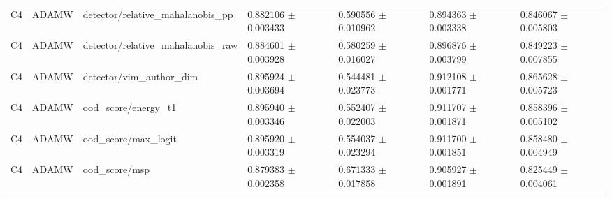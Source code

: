 \begin{longtable}{lllllll}
C4 & ADAMW & detector/relative\_mahalanobis\_pp & 0.882106 $\pm$ 0.003433 & 0.590556 $\pm$ 0.010962 & 0.894363 $\pm$ 0.003338 & 0.846067 $\pm$ 0.005803 \\
C4 & ADAMW & detector/relative\_mahalanobis\_raw & 0.884601 $\pm$ 0.003928 & 0.580259 $\pm$ 0.016027 & 0.896876 $\pm$ 0.003799 & 0.849223 $\pm$ 0.007855 \\
C4 & ADAMW & detector/vim\_author\_dim & 0.895924 $\pm$ 0.003694 & 0.544481 $\pm$ 0.023773 & 0.912108 $\pm$ 0.001771 & 0.865628 $\pm$ 0.005723 \\
C4 & ADAMW & ood\_score/energy\_t1 & 0.895940 $\pm$ 0.003346 & 0.552407 $\pm$ 0.022003 & 0.911707 $\pm$ 0.001871 & 0.858396 $\pm$ 0.005102 \\
C4 & ADAMW & ood\_score/max\_logit & 0.895920 $\pm$ 0.003319 & 0.554037 $\pm$ 0.023294 & 0.911700 $\pm$ 0.001851 & 0.858480 $\pm$ 0.004949 \\
C4 & ADAMW & ood\_score/msp & 0.879383 $\pm$ 0.002358 & 0.671333 $\pm$ 0.017858 & 0.905927 $\pm$ 0.001891 & 0.825449 $\pm$ 0.004061 \\
\end{longtable}
